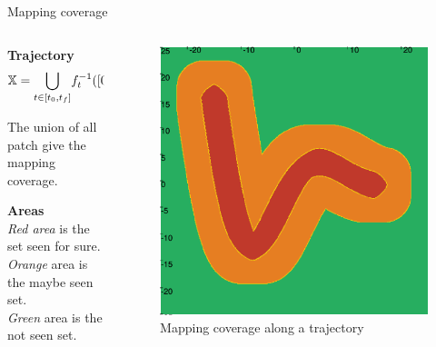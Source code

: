 \begin{frame}{Mapping coverage}
    \begin{columns}

        \begin{column}{0.5\textwidth}
            \textbf{Trajectory}
            $$\mathbb{X} = \underset{t \in [t_0, t_f]}{\bigcup} f_t^{-1}([0, \mathnormal{r}[)$$

            The union of all patch give the mapping coverage.
            
            \vspace{0.5cm}
            \textbf{Areas} \\
            \textit{Red area} is the set seen for sure. \\
            \textit{Orange} area is the maybe seen set. \\
            \textit{Green} area is the not seen set.
           
        \end{column}

        \begin{column}{0.5\textwidth}
            \begin{figure}
                \centering
                \includegraphics[width=\textwidth]{images/Thicksets/thickset_trajectory.png}
                \caption{Mapping coverage along a trajectory}
            \end{figure}
        \end{column}
    \end{columns}
\end{frame}
